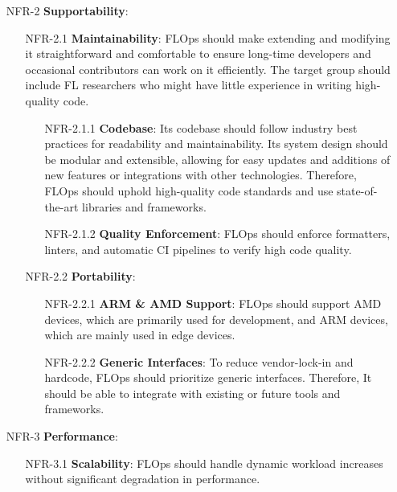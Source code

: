 \begin{itemize}
\begin{itemize}
        \end{itemize}
    \item [NFR-2] {\textbf{Supportability}}:
        \begin{itemize}
        \item [NFR-2.1] {\textbf{Maintainability}}:
            FLOps should make extending and modifying it straightforward and comfortable to ensure long-time developers and occasional contributors can work on it efficiently.
            The target group should include FL researchers who might have little experience in writing high-quality code.
            \begin{itemize}
                \item [NFR-2.1.1] {\textbf{Codebase}}:
                    Its codebase should follow industry best practices for readability and maintainability.
                    Its system design should be modular and extensible, allowing for easy updates and additions of new features or integrations with other technologies.
                    Therefore, FLOps should uphold high-quality code standards and use state-of-the-art libraries and frameworks.
                \item [NFR-2.1.2] {\textbf{Quality Enforcement}}:
                    FLOps should enforce formatters, linters, and automatic CI pipelines to verify high code quality.
            \end{itemize}
        \item [NFR-2.2] {\textbf{Portability}}:
            \begin{itemize}
                \item [NFR-2.2.1] {\textbf{ARM \& AMD Support}}:
                    FLOps should support AMD devices, which are primarily used for development, and ARM devices, which are mainly used in edge devices.
                \item [NFR-2.2.2] {\textbf{Generic Interfaces}}:
                    To reduce vendor-lock-in and hardcode, FLOps should prioritize generic interfaces.
                    Therefore, It should be able to integrate with existing or future tools and frameworks.
            \end{itemize}
        \end{itemize}
    \item [NFR-3] {\textbf{Performance}}:
        \begin{itemize}
        \item [NFR-3.1] {\textbf{Scalability}}:
            FLOps should handle dynamic workload increases without significant degradation in performance.

\end{itemize}
\end{itemize}
